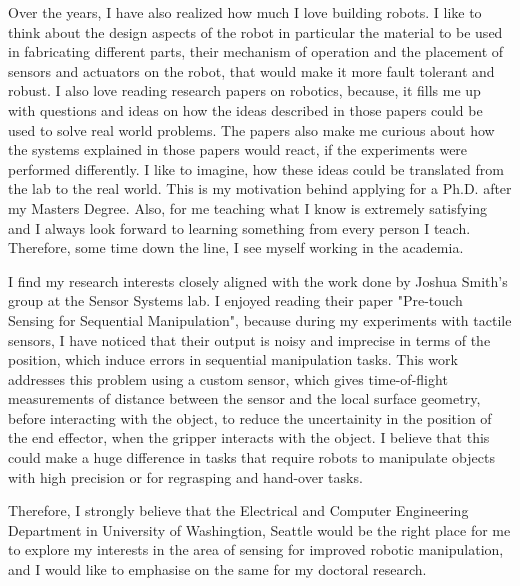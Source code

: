 \documentclass[10pt]{article}
\newcommand{\statement}[1]{\par\medskip
  \textcolor{blue}{\textbf{#1:}}\space
}
\begin{document}
\par
 Over the years, I have also realized how much I love building robots. I like to think about the design aspects of the robot in particular the material to be used in fabricating different parts, their mechanism of operation and the placement of sensors and actuators on the robot, that would make it more fault tolerant and robust.  I also love reading research papers on robotics, because, it fills me up with questions and ideas on how the ideas described in those papers could be used to solve real world problems. The papers also make me curious about how the systems explained in those papers would react, if the experiments were performed differently. I like to imagine, how these ideas could be translated from the lab to the real world. This is my motivation behind applying for a Ph.D. after my Masters Degree. Also, for me teaching what I know is extremely satisfying and I always look forward to learning something from every person I teach. Therefore, some time down the line, I see myself working in the academia. 
 \par
 I find my research interests closely aligned with the work done by Joshua Smith's group at the Sensor Systems lab. I enjoyed reading their paper "Pre-touch Sensing for Sequential Manipulation", because during my experiments with tactile sensors, I have noticed that their output is noisy and imprecise in terms of the position, which induce errors in sequential manipulation tasks. This work addresses this problem using a custom sensor, which gives time-of-flight measurements of distance between the sensor and the local surface geometry, before interacting with the object, to reduce the uncertainity in the position of the end effector, when the gripper interacts with the object. I believe that this could make a huge difference in tasks that require robots to manipulate objects with high precision or for regrasping and hand-over tasks. 
\par
Therefore, I strongly believe that the Electrical and Computer Engineering Department in University of Washingtion, Seattle would be the right place for me to explore my interests in the area of sensing for improved robotic manipulation, and I would like to emphasise on the same for my doctoral research. 








%
%
\end{document}
